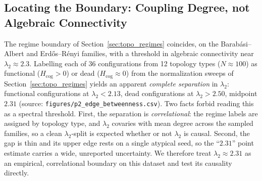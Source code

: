 ﻿\documentclass[11pt]{article}
\begin{document}
\subsection{Locating the Boundary: Coupling Degree, not Algebraic Connectivity}
\label{sec:lambda2}

The regime boundary of Section~\ref{sec:topo_regimes} coincides, on the Barab\'asi--Albert and Erd\H{o}s--R\'enyi families, with a threshold in algebraic connectivity near $\lambda_2 \approx 2.3$. Labelling each of 36 configurations from 12 topology types ($N \approx 100$) as functional ($H_{\mathrm{cog}} > 0$) or dead ($H_{\mathrm{cog}} \approx 0$) from the normalization sweeps of Section~\ref{sec:topo_regimes} yields an apparent \emph{complete separation} in $\lambda_2$: functional configurations at $\lambda_2 < 2.13$, dead configurations at $\lambda_2 > 2.50$, midpoint $2.31$ (source: \texttt{figures/p2\_edge\_betweenness.csv}). Two facts forbid reading this as a spectral threshold. First, the separation is \emph{correlational}: the regime labels are assigned by topology type, and $\lambda_2$ covaries with mean degree across the sampled families, so a clean $\lambda_2$-split is expected whether or not $\lambda_2$ is causal. Second, the gap is thin and its upper edge rests on a single atypical seed, so the ``$2.31$'' point estimate carries a wide, unreported uncertainty. We therefore treat $\lambda_2 \approx 2.31$ as an empirical, correlational boundary on this dataset and test its causality directly.
\end{document}
